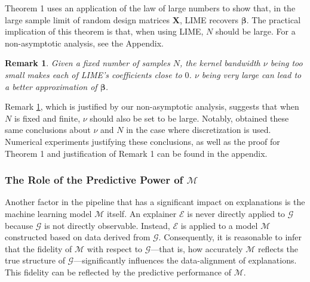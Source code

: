 \documentclass[12pt]{article}  %
\newcommand{\mM}{\mathcal{M}}
\newtheorem{remark2}[thm]{Remark}
\begin{document}
             Theorem 1 uses an application of the law of large numbers to show that, in the large sample limit of random design matrices $\mathbf{X}$, LIME recovers $\boldsymbol{\beta}$. The practical implication of this theorem is that, when using LIME, $N$ should be large.  For a non-asymptotic analysis, see the Appendix. %

            \begin{remark2}
                \label{nu_remark}
                Given a fixed number of samples $N$, the kernel bandwidth $\nu$ being too small makes each of LIME's coefficients close to $0$. $\nu$ being very large can lead to a better approximation of $\boldsymbol{\beta}$. 
            \end{remark2}

            Remark \ref{nu_remark}, which is justified by our non-asymptotic analysis, suggests that when $N$ is fixed and finite, $\nu$  should also be set to be large. Notably, \citep{garreau20theoretical} obtained these same conclusions about $\nu$ and $N$ in the case where discretization is used. Numerical experiments justifying these conclusions, as well as the proof for Theorem 1 and justification of Remark 1 can be found in the appendix. 
    \subsubsection{The Role of the Predictive Power of $\mathcal{M}$}
        \label{sec:role_of_predictive_power}
           Another factor in the pipeline that has a significant impact on  explanations is the machine learning model $\mathcal{M}$ itself. 
      An explainer $\mathcal{E}$ is never directly applied to $\mathcal{G}$ because  $\mathcal{G}$ is not directly observable. Instead, $\mathcal{E}$ is applied to a model $\mathcal{M}$ constructed based on data derived from $\mathcal{G}$. Consequently, it is reasonable to infer that the fidelity of $\mathcal{M}$ with respect to $\mathcal{G}$—that is, how accurately $\mathcal{M}$ reflects the true structure of $\mathcal{G}$—significantly influences the data-alignment of explanations. This fidelity can be reflected by the predictive performance of $\mM$.  
\end{document}
